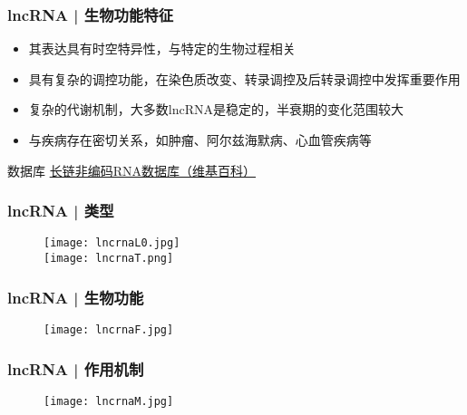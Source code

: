 \begin{frame}
  \frametitle{lncRNA | 生物功能特征}
  \begin{itemize}
    \item 其表达具有时空特异性，与特定的生物过程相关
    \item 具有复杂的调控功能，在染色质改变、转录调控及后转录调控中发挥重要作用
    \item 复杂的代谢机制，大多数lncRNA是稳定的，半衰期的变化范围较大
    \item 与疾病存在密切关系，如肿瘤、阿尔兹海默病、心血管疾病等
  \end{itemize}
  \pause
  \begin{block}{数据库}
    \href{http://zh.wikipedia.org/wiki/\%E9\%95\%BF\%E9\%93\%BE\%E9\%9D\%9E\%E7\%BC\%96\%E7\%A0\%81RNA\%E6\%95\%B0\%E6\%8D\%AE\%E5\%BA\%93}{长链非编码RNA数据库（维基百科）}
  \end{block}
\end{frame}

\begin{frame}
  \frametitle{lncRNA | 类型}
  \begin{figure}
    \centering
    \texttt{[image: lncrnaL0.jpg]}\\
    \texttt{[image: lncrnaT.png]}
  \end{figure}
\end{frame}

\begin{frame}
  \frametitle{lncRNA | 生物功能}
  \begin{figure}
    \centering
    \texttt{[image: lncrnaF.jpg]}
  \end{figure}
\end{frame}

\begin{frame}
  \frametitle{lncRNA | 作用机制}
  \begin{figure}
    \centering
    \texttt{[image: lncrnaM.jpg]}
  \end{figure}
\end{frame}


